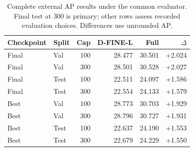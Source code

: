 \begin{table}[t]
\centering
\caption{Complete external AP results under the common evaluator. Final test at 300 is primary; other rows assess recorded evaluation choices. Differences use unrounded AP.}
\label{tab:sensitivity}
\small\setlength{\tabcolsep}{2.5pt}
\begin{tabular*}{\columnwidth}{@{\extracolsep{\fill}}llrrrr@{}}
\toprule
Checkpoint & Split & Cap & D-FINE-L & Full & $\Delta$ \\
\midrule
Final & Val & 100 & 28.477 & 30.501 & +2.024 \\
Final & Val & 300 & 28.501 & 30.528 & +2.027 \\
Final & Test & 100 & 22.511 & 24.097 & +1.586 \\
Final & Test & 300 & 22.554 & 24.133 & +1.579 \\
Best & Val & 100 & 28.773 & 30.703 & +1.929 \\
Best & Val & 300 & 28.796 & 30.727 & +1.931 \\
Best & Test & 100 & 22.637 & 24.190 & +1.553 \\
Best & Test & 300 & 22.679 & 24.229 & +1.550 \\
\bottomrule
\end{tabular*}
\end{table}